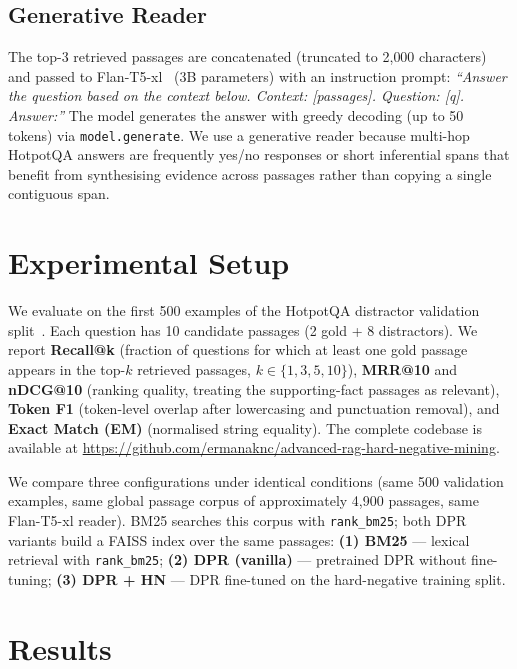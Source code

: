 \documentclass{llncs}
\begin{document}
\subsection{Generative Reader}

The top-3 retrieved passages are concatenated (truncated to 2{,}000 characters)
and passed to Flan-T5-xl~\cite{chung2022flant5} (3B parameters) with an
instruction prompt:
\textit{``Answer the question based on the context below. Context: [passages].
Question: [q]. Answer:''}
The model generates the answer with greedy decoding (up to 50 tokens) via
\texttt{model.generate}. We use a generative reader because multi-hop HotpotQA
answers are frequently yes/no responses or short inferential spans that benefit
from synthesising evidence across passages rather than copying a single
contiguous span.

\section{Experimental Setup}

We evaluate on the first 500 examples of the HotpotQA distractor validation
split~\cite{yang2018hotpotqa}. Each question has 10 candidate passages (2
gold + 8 distractors). We report \textbf{Recall@k} (fraction of questions for
which at least one gold passage appears in the top-$k$ retrieved passages,
$k \in \{1, 3, 5, 10\}$), \textbf{MRR@10} and \textbf{nDCG@10} (ranking
quality, treating the supporting-fact passages as relevant), \textbf{Token F1}
(token-level overlap after lowercasing and punctuation removal), and
\textbf{Exact Match (EM)} (normalised string equality). The complete codebase
is available at
\url{https://github.com/ermanaknc/advanced-rag-hard-negative-mining}.

We compare three configurations under identical conditions (same 500 validation
examples, same global passage corpus of approximately 4{,}900 passages, same
Flan-T5-xl reader). BM25 searches this corpus with \texttt{rank\_bm25}; both
DPR variants build a FAISS index over the same passages:
\textbf{(1) BM25} --- lexical retrieval with \texttt{rank\_bm25};
\textbf{(2) DPR (vanilla)} --- pretrained DPR without fine-tuning;
\textbf{(3) DPR + HN} --- DPR fine-tuned on the hard-negative training split.

\section{Results}
\end{document}
